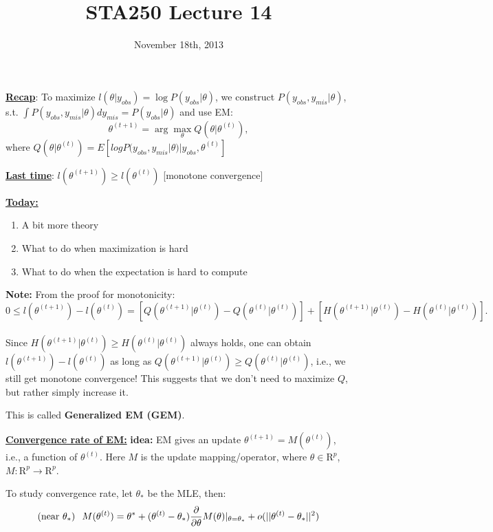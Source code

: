 \documentclass[12pt,letterpaper]{article}
\newcommand{\argmax}{\arg\!\max}
\begin{document}
\title{STA250 Lecture 14}
\date{November 18th, 2013}
\maketitle


\underline{\textbf{Recap}}: To maximize $l(\theta|y_{obs})=\log P(y_{obs}|\theta)$, we construct $P(y_{obs},y_{mis}|\theta)$, s.t. $\int P(y_{obs},y_{mis}|\theta) dy_{mis}=P(y_{obs}|\theta)$ and use EM:
\[ \theta^{(t+1)} = \argmax_{\theta} Q(\theta|\theta^{(t)}),\]
where $Q(\theta|\theta^{(t)})=E[log P(y_{obs},y_{mis}|\theta)|y_{obs},\theta^{(t)}]$

\vspace{0.2in}
\underline{\textbf{Last time}}: $l(\theta^{(t+1)}) \geq l(\theta^{(t)})$ [monotone convergence]

 \underline{\textbf{Today:}} \begin{enumerate}
\item A bit more theory
\item What to do when maximization is hard
\item What to do when the expectation is hard to compute
\end{enumerate}

\textbf{Note:} From the proof for monotonicity:\\
\[0\leq l(\theta^{(t+1)})-l(\theta^{(t)}) = [Q(\theta^{(t+1)}|\theta^{(t)})-Q(\theta^{(t)}|\theta^{(t)})]+[H(\theta^{(t+1)}|\theta^{(t)})-H(\theta^{(t)}|\theta^{(t)})].\]\\
Since $H(\theta^{(t+1)}|\theta^{(t)})\geq H(\theta^{(t)}|\theta^{(t)})$ always holds, one can obtain $l(\theta^{(t+1)})-l(\theta^{(t)})$ as long as $Q(\theta^{(t+1)}|\theta^{(t)})\geq Q(\theta^{(t)}|\theta^{(t)})$, i.e., we still get monotone convergence! This suggests that  we don't need to maximize $Q$, but rather simply increase it.

This is called \textbf{Generalized EM (GEM)}.

\vspace{0.1in}
\underline{\textbf{Convergence rate of EM:}} 
\textbf{idea:} EM gives an update $\theta^{(t+1)} = M(\theta^{(t)})$, i.e., a function of $\theta^{(t)}$. Here $M$ is the update mapping/operator, where $\theta \in \mathrm{R}^p$, $ M: \mathrm{R}^p\rightarrow \mathrm{R}^p$.

To study convergence rate, let $\theta_*$ be the MLE, then:
\[ (\text{near }\theta_*)\hspace{0.1in} M(\theta^{(t)})=\theta^* + (\theta^{(t)}-\theta_*)\frac{\partial}{\partial \theta}M(\theta)|_{\theta=\theta_*}+o(||\theta^{(t)}-\theta_*||^2)\]
\end{document}
